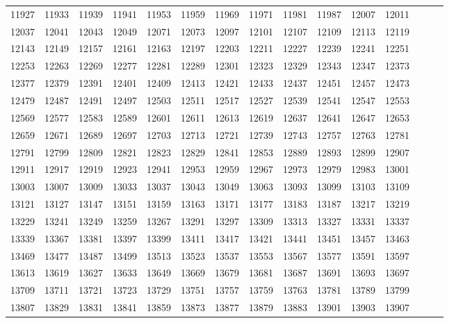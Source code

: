\documentclass[10pt, a4paper]{article}
\begin{document}
\begin{center}
\begin{longtable}{c c c c c c c c c c c c c c c}
        11927 & 11933 & 11939 & 11941 & 11953 & 11959 & 11969 & 11971 & 11981 & 11987 & 12007 & 12011 \\
        12037 & 12041 & 12043 & 12049 & 12071 & 12073 & 12097 & 12101 & 12107 & 12109 & 12113 & 12119 \\
        12143 & 12149 & 12157 & 12161 & 12163 & 12197 & 12203 & 12211 & 12227 & 12239 & 12241 & 12251 \\
        12253 & 12263 & 12269 & 12277 & 12281 & 12289 & 12301 & 12323 & 12329 & 12343 & 12347 & 12373 \\
        12377 & 12379 & 12391 & 12401 & 12409 & 12413 & 12421 & 12433 & 12437 & 12451 & 12457 & 12473 \\
        12479 & 12487 & 12491 & 12497 & 12503 & 12511 & 12517 & 12527 & 12539 & 12541 & 12547 & 12553 \\
        12569 & 12577 & 12583 & 12589 & 12601 & 12611 & 12613 & 12619 & 12637 & 12641 & 12647 & 12653 \\
        12659 & 12671 & 12689 & 12697 & 12703 & 12713 & 12721 & 12739 & 12743 & 12757 & 12763 & 12781 \\
        12791 & 12799 & 12809 & 12821 & 12823 & 12829 & 12841 & 12853 & 12889 & 12893 & 12899 & 12907 \\
        12911 & 12917 & 12919 & 12923 & 12941 & 12953 & 12959 & 12967 & 12973 & 12979 & 12983 & 13001 \\
        13003 & 13007 & 13009 & 13033 & 13037 & 13043 & 13049 & 13063 & 13093 & 13099 & 13103 & 13109 \\
        13121 & 13127 & 13147 & 13151 & 13159 & 13163 & 13171 & 13177 & 13183 & 13187 & 13217 & 13219 \\
        13229 & 13241 & 13249 & 13259 & 13267 & 13291 & 13297 & 13309 & 13313 & 13327 & 13331 & 13337 \\
        13339 & 13367 & 13381 & 13397 & 13399 & 13411 & 13417 & 13421 & 13441 & 13451 & 13457 & 13463 \\
        13469 & 13477 & 13487 & 13499 & 13513 & 13523 & 13537 & 13553 & 13567 & 13577 & 13591 & 13597 \\
        13613 & 13619 & 13627 & 13633 & 13649 & 13669 & 13679 & 13681 & 13687 & 13691 & 13693 & 13697 \\
        13709 & 13711 & 13721 & 13723 & 13729 & 13751 & 13757 & 13759 & 13763 & 13781 & 13789 & 13799 \\
        13807 & 13829 & 13831 & 13841 & 13859 & 13873 & 13877 & 13879 & 13883 & 13901 & 13903 & 13907 \\

\end{longtable}
\end{center}
\end{document}
